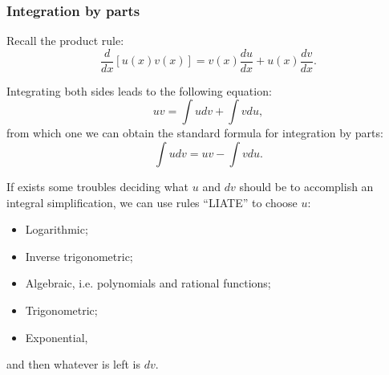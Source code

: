 \subsubsection*{Integration by parts}
\par 
Recall the product rule:
\[
    \dfrac{d}{dx} \left[ u(x)v(x)\right] = v(x) \dfrac{du}{dx} + u(x) \dfrac{dv}{dx}.  
\]
\par
Integrating both sides leads to the following equation:
\[
    uv = \int u dv + \int v du,  
\]
from which one we can obtain the standard formula for integration by parts:
\[
    \int   u dv = uv - \int v du.
\]
\par 
If exists some troubles deciding what $u$ and $dv$ should be to accomplish an integral simplification, we can use rules ``LIATE'' to choose $u$:
\begin{itemize}
    \item Logarithmic;
    \item Inverse trigonometric;
    \item Algebraic, i.e. polynomials and rational functions;
    \item Trigonometric;
    \item Exponential,
\end{itemize}
and then whatever is left is $dv$. 
